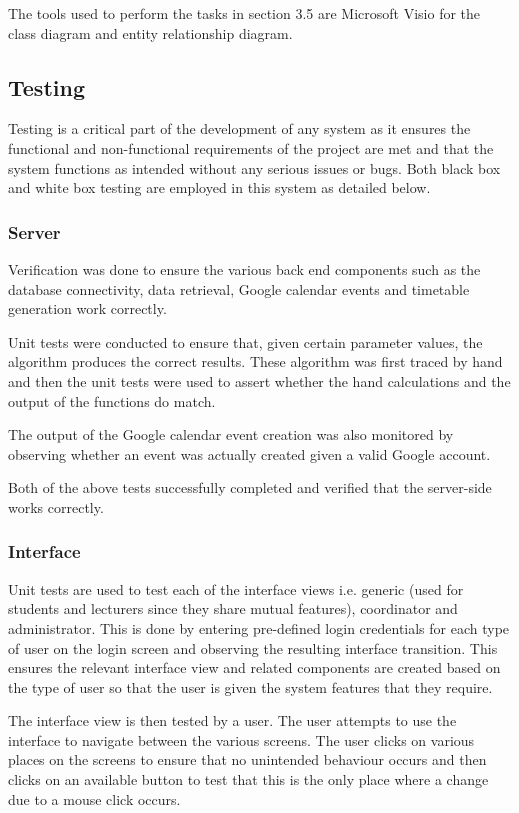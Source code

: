 \documentclass{article}
\begin{document}
The tools used to perform the tasks in section 3.5 are Microsoft Visio for the class diagram and entity relationship diagram.

\subsection{Testing}

Testing is a critical part of the development of any system as it ensures the functional and non-functional requirements of the project are met and that the system functions as intended without any serious issues or bugs. Both black box and white box testing are employed in this system as detailed below.

\subsubsection{Server}

Verification was done to ensure the various back end components such as the database connectivity, data retrieval, Google calendar events and timetable generation work correctly.

Unit tests were conducted to ensure that, given certain parameter values, the algorithm produces the correct results. These algorithm was first traced by hand and then the unit tests were used to assert whether the hand calculations and the output of the functions do match.

The output of the Google calendar event creation was also monitored by observing whether an event was actually created given a valid Google account.

Both of the above tests successfully completed and verified that the server-side works correctly.

\subsubsection{Interface}

Unit tests are used to test each of the interface views i.e. generic (used for students and lecturers since they share mutual features), coordinator and administrator. This is done by entering pre-defined login credentials for each type of user on the login screen and observing the resulting interface transition. This ensures the relevant interface view and related components are created based on the type of user so that the user is given the system features that they require.

The interface view is then tested by a user. The user attempts to use the interface to navigate between the various screens. The user clicks on various places on the screens to ensure that no unintended behaviour occurs and then clicks on an available button to test that this is the only place where a change due to a mouse click occurs.
\end{document}

